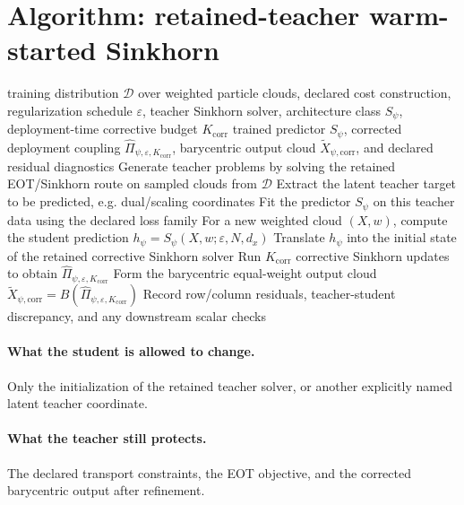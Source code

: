 \section{Algorithm: retained-teacher warm-started Sinkhorn}
\label{sec:bf-learned-ot-teacher}

\begin{algorithm}[ht]
\caption{\texttt{train\_and\_deploy\_warmstarted\_sinkhorn}}
\begin{algorithmic}[1]
\Require training distribution \(\mathcal D\) over weighted particle clouds, declared cost construction, regularization schedule \(\varepsilon\), teacher Sinkhorn solver, architecture class \(S_\psi\), deployment-time corrective budget \(K_{\mathrm{corr}}\)
\Ensure trained predictor \(S_\psi\), corrected deployment coupling \(\widehat\Pi_{\psi,\varepsilon,K_{\mathrm{corr}}}\), barycentric output cloud \(\widetilde X_{\psi,\mathrm{corr}}\), and declared residual diagnostics
\State Generate teacher problems by solving the retained EOT/Sinkhorn route on sampled clouds from \(\mathcal D\)
\State Extract the latent teacher target to be predicted, e.g. dual/scaling coordinates
\State Fit the predictor \(S_\psi\) on this teacher data using the declared loss family
\State For a new weighted cloud \((X,w)\), compute the student prediction \(h_\psi=S_\psi(X,w;\varepsilon,N,d_x)\)
\State Translate \(h_\psi\) into the initial state of the retained corrective Sinkhorn solver
\State Run \(K_{\mathrm{corr}}\) corrective Sinkhorn updates to obtain \(\widehat\Pi_{\psi,\varepsilon,K_{\mathrm{corr}}}\)
\State Form the barycentric equal-weight output cloud \(\widetilde X_{\psi,\mathrm{corr}}=B(\widehat\Pi_{\psi,\varepsilon,K_{\mathrm{corr}}})\)
\State Record row/column residuals, teacher-student discrepancy, and any downstream scalar checks
\end{algorithmic}
\end{algorithm}

\paragraph{What the student is allowed to change.}
Only the initialization of the retained teacher solver, or another explicitly
named latent teacher coordinate.

\paragraph{What the teacher still protects.}
The declared transport constraints, the EOT objective, and the corrected
barycentric output after refinement.

